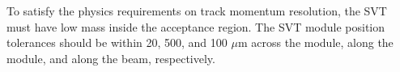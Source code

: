 
To satisfy the physics requirements on track momentum resolution, the SVT must have low mass inside the acceptance region. The SVT module position tolerances should be within 20, 500, and 100 $\mu$m across the module, along the module, and along the beam, respectively.
